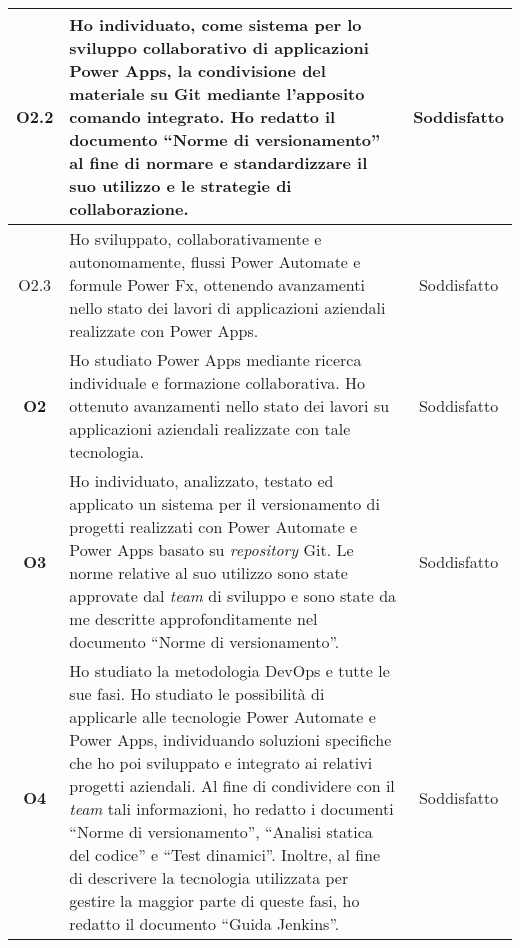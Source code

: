 \begin{longtable}{|c|p{8cm}|c|}
    \hline O2.2  & Ho individuato, come sistema per lo sviluppo collaborativo di applicazioni Power Apps, la condivisione del materiale su Git mediante l'apposito comando integrato. Ho redatto il documento “Norme di versionamento” al fine di normare e standardizzare il suo utilizzo e le strategie di collaborazione. & Soddisfatto\\
    \hline O2.3  & Ho sviluppato, collaborativamente e autonomamente, flussi Power Automate e formule Power Fx, ottenendo avanzamenti nello stato dei lavori di applicazioni aziendali realizzate con Power Apps. & Soddisfatto\\
    \hline \textbf{O2}  & Ho studiato Power Apps mediante ricerca individuale e formazione collaborativa. Ho ottenuto avanzamenti nello stato dei lavori su applicazioni aziendali realizzate con tale tecnologia. & Soddisfatto\\
    \hline \textbf{O3}  & Ho individuato, analizzato, testato ed applicato un sistema per il versionamento di progetti realizzati con Power Automate e Power Apps basato su \emph{repository} Git. Le norme relative al suo utilizzo sono state approvate dal \emph{team} di sviluppo e sono state da me descritte approfonditamente nel documento “Norme di versionamento”. & Soddisfatto\\
    \hline \textbf{O4}  & Ho studiato la metodologia \gls{DevOps} e tutte le sue fasi. Ho studiato le possibilità di applicarle alle tecnologie Power Automate e Power Apps, individuando soluzioni specifiche che ho poi sviluppato e integrato ai relativi progetti aziendali. Al fine di condividere con il \emph{team} tali informazioni, ho redatto i documenti “Norme di versionamento”, “Analisi statica del codice” e “Test dinamici”. Inoltre, al fine di descrivere la tecnologia utilizzata per gestire la maggior parte di queste fasi, ho redatto il documento “Guida Jenkins”. & Soddisfatto\\
\end{longtable}

